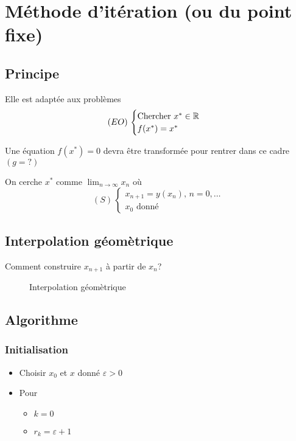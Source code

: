 \section{Méthode d'itération (ou du point fixe)}
\subsection{Principe}
Elle est adaptée aux problèmes
\[
    (EO) \, \begin{cases}
    \text{Chercher } x^* \in \mathbb{R}\\
    f(x^*) = x^*
\end{cases}
\] 
\begin{remark}
   Une équation $f(x^*) = 0$ devra être transformée pour rentrer dans ce cadre $(g = ?)$ \par
   On cerche $x^*$ comme  $\lim_{n \to \infty} x_n$ où 
   \[
       (S) \, \begin{cases}
           x_{n+1} = y(x_n), \, n = 0, \ldots \\
           x_0 \text{ donné }
       \end{cases}
   \] 
\end{remark}

\subsection{Interpolation géomètrique}
Comment construire $x_{n+1}$ à partir de $x_n$? 

\begin{figure}[H]
    \centering
    \caption{Interpolation géomètrique}
    \label{fig:interpolation-geometrique}
\end{figure}

\subsection{Algorithme}
\subsubsection*{Initialisation}
\begin{itemize}
    \item Choisir $x_0$ et $x$ donné  $\varepsilon > 0$
    \item Pour  
        \begin{itemize}
            \item $k = 0$
            \item  $r_k = \varepsilon + 1$
        \end{itemize}
\end{itemize}
